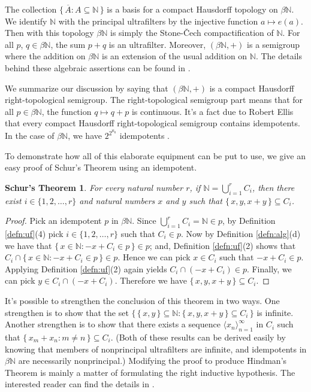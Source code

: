 \documentclass[12pt]{article}
\theoremstyle{plain}
\newtheorem{schur}[thm]{Schur's Theorem}
\theoremstyle{definition}
\newcommand{\bbN}{\mathbb{N}}
\newcommand{\la}{\langle}
\newcommand{\ra}{\rangle}
\begin{document}
The collection $\{\, \overline{A} : A \subseteq \bbN \,\}$ is a
basis for a compact Hausdorff topology on $\beta\bbN$.
We identify $\bbN$ with the principal ultrafilters by the injective
function $a \mapsto e(a)$. 
Then with this topology $\beta\bbN$ is simply the Stone-\v{C}ech
compactification of $\bbN$. 
For all $p$, $q \in \beta\bbN$, the sum $p+q$ is an ultrafilter.
Moreover, $(\beta\bbN, +)$ is a semigroup where the addition on
$\beta\bbN$ is an extension of the usual addition on $\bbN$. 
The details behind these algebraic assertions can be found in
\cite[Chapter 4 Section 1]{Hindman:1998fk}.

We summarize our discussion by saying that $(\beta\bbN,
+)$ is a compact Hausdorff right-topological semigroup. 
The right-topological semigroup part means that for all $p \in
\beta\bbN$, the function $q \mapsto q+p$ is continuous.
It's a fact due to Robert Ellis \cite[Corollary 2.10]{Ellis:1969zr}
that every compact Hausdorff right-topological semigroup contains
idempotents. 
In the case of $\beta\bbN$, we have 
$2^{2^{\aleph_0}}$ idempotents \cite[Theorem 6.44]{Hindman:1998fk}. 

To demonstrate how all of this elaborate equipment can be put to use,
we give an easy proof of Schur's Theorem using an idempotent.
\begin{schur}
  For every natural number $r$, if  \/ $\bbN = \bigcup_{i=1}^r C_i$,
  then there exist $i \in \{1, 2, \ldots, r\}$ and natural numbers
  $x$ and $y$ such that $\{\, x, y, x+y \,\} \subseteq C_i$.
\end{schur}
\begin{proof}
  Pick an idempotent $p$ in $\beta\bbN$.
  Since $\bigcup_{i=1}^r C_i = \bbN \in p$, by Definition
  \ref{defn:uf}(4) pick $i \in \{1, 2, \ldots, r\}$ such that $C_i \in
  p$.
  Now by Definition \ref{defn:alg}(d) we have that $\{\, x \in \bbN :
  -x + C_i \in p \,\} \in p$; and, Definition \ref{defn:uf}(2) shows
  that $C_i \cap \{\, x \in \bbN : -x + C_i \in p \,\} \in p$.
  Hence we can pick $x \in C_i$ such that $-x + C_i \in p$. 
  Applying Definition \ref{defn:uf}(2) again yields $C_i \cap (-x +
  C_i) \in p$.
  Finally, we can pick $y \in C_i \cap (-x+C_i)$.
  Therefore we have $\{\, x, y, x+y \,\} \subseteq C_i$.
\end{proof}

It's possible to strengthen the conclusion of this theorem in two
ways.
One strengthen is to show that the set $\bigl\{\,\{\, x, y \,\}
\subseteq \bbN : \{\,x,y,x+y\,\} \subseteq C_i \,\bigr\}$ is infinite.
Another strengthen is to show that there exists a sequence $\la x_n
\ra_{n=1}^\infty$ in $C_i$ such that $\{\, x_m + x_n : m \ne n \,\}
\subseteq C_i$.
(Both of these results can be derived easily by knowing that members
of nonprincipal ultrafilters are infinite, and idempotents in
$\beta\bbN$ are necessarily nonprincipal.)
Modifying the proof to produce Hindman's Theorem is mainly a matter of
formulating the right inductive hypothesis.
The interested reader can find the details in \cite[Theorem
5.8]{Hindman:1998fk}. 
\end{document}
